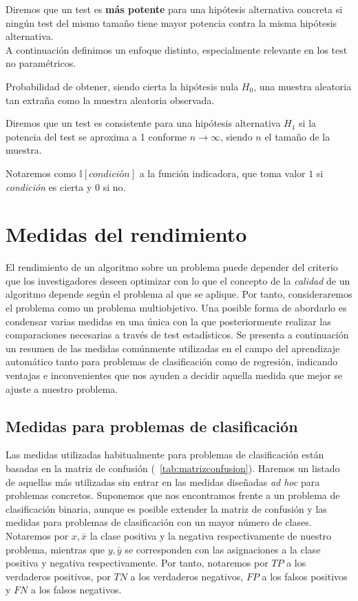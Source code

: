 	Diremos que un test es \textbf{más potente} para una 
hipótesis alternativa concreta si ningún test del mismo 
tamaño tiene mayor potencia contra la misma hipótesis 
alternativa.\\
	A continuación definimos un enfoque distinto,
especialmente relevante en los test no paramétricos. 
	
\begin{definicion}[$p$-valor]
	Probabilidad de obtener, siendo cierta la hipótesis nula 
$H_0$, una muestra aleatoria tan extraña como la muestra
aleatoria observada.
\end{definicion}

\begin{definicion}[Consistencia]
	Diremos que un test es consistente para una hipótesis 
alternativa $H_1$ si la potencia del test se aproxima a 1 
conforme $n \rightarrow \infty$, siendo $n$ el tamaño de la 
muestra.
\end{definicion}

	Notaremos como $\mathbb{I}[\textit{condición}]$ a la 
función indicadora, que toma valor $1$ si \textit{condición} es
cierta y 0 si no.


\section*{Medidas del rendimiento}
	
	El rendimiento de un algoritmo sobre un problema puede 
depender del criterio que los investigadores deseen optimizar 
con lo que el concepto de la \textit{calidad} de un algoritmo 
depende según el problema al que se aplique. Por tanto, 
consideraremos el problema como un problema multiobjetivo. 
Una posible forma de abordarlo es condensar varias medidas en 
una única con la que posteriormente realizar las 
comparaciones necesarias a través de test estadísticos. Se 
presenta a continuación un resumen de las medidas comúnmente 
utilizadas en el campo del aprendizaje automático tanto para 
problemas de clasificación como de regresión, indicando 
ventajas e inconvenientes que nos ayuden a decidir aquella 
medida que mejor se ajuste a nuestro problema.
	
\subsection*{Medidas para problemas de clasificación}

	Las medidas utilizadas habitualmente para problemas de 
clasificación están basadas en la matriz de confusión 
(~\ref{tab:matrizconfusion}). Haremos un listado de aquellas 
más utilizadas sin entrar en las medidas diseñadas \textit{ad 
hoc} para problemas concretos. Suponemos que nos encontramos 
frente a un problema de clasificación binaria, aunque es 
posible extender la matriz de confusión y las medidas para 
problemas de clasificación con un mayor número de clases.
Notaremos por $x, \bar{x}$ la clase positiva y la negativa
respectivamente de nuestro problema, mientras que $y,\bar{y}$
se corresponden con las asignaciones a la clase positiva
y negativa respectivamente. Por tanto, notaremos por $TP$ a
los verdaderos positivos, por $TN$ a los verdaderos negativos,
$FP$ a los falsos positivos y $FN$ a los falsos negativos.

